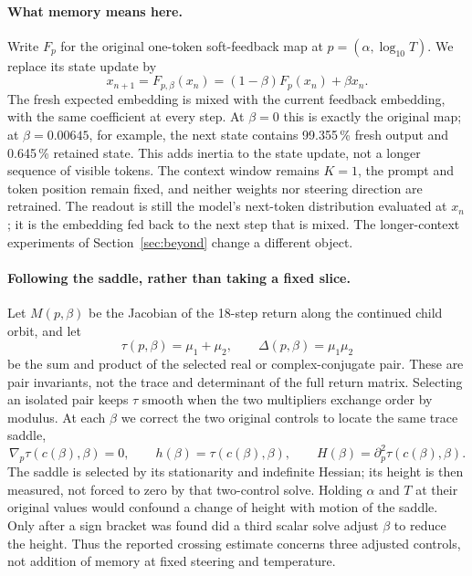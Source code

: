 \documentclass[11pt,letterpaper]{article}
\begin{document}
\paragraph{What memory means here.} Write $F_p$ for the original one-token soft-feedback map at
$p=(\alpha,\log_{10}T)$. We replace its state update by
\begin{equation}
 x_{n+1}=F_{p,\beta}(x_n)=(1-\beta)F_p(x_n)+\beta x_n.
 \label{eq:retainedfeedback}
\end{equation}
The fresh expected embedding is mixed with the current feedback embedding, with the same coefficient at every
step. At $\beta=0$ this is exactly the original map; at $\beta=0.00645$, for example, the next state contains
99.355\,\% fresh output and 0.645\,\% retained state. This adds inertia to the state update, not a longer sequence
of visible tokens. The context window remains $K=1$, the prompt and token position remain fixed, and neither
weights nor steering direction are retrained. The readout is still the model's next-token distribution evaluated
at $x_n$; it is the embedding fed back to the next step that is mixed. The longer-context experiments of
Section~\ref{sec:beyond} change a different object.

\paragraph{Following the saddle, rather than taking a fixed slice.} Let $M(p,\beta)$ be the Jacobian of the
18-step return along the continued child orbit, and let
\begin{equation}
 \tau(p,\beta)=\mu_1+\mu_2,\qquad \Delta(p,\beta)=\mu_1\mu_2
 \label{eq:memorypair}
\end{equation}
be the sum and product of the selected real or complex-conjugate pair. These are pair invariants, not the trace
and determinant of the full return matrix. Selecting an isolated pair keeps $\tau$ smooth when the two multipliers
exchange order by modulus. At each $\beta$ we correct the two original controls to locate the same trace saddle,
\begin{equation}
 \nabla_p\tau(c(\beta),\beta)=0,\qquad
 h(\beta)=\tau(c(\beta),\beta),\qquad
 H(\beta)=\partial_p^2\tau(c(\beta),\beta).
 \label{eq:memorysaddle}
\end{equation}
The saddle is selected by its stationarity and indefinite Hessian; its height is then measured, not forced to
zero by that two-control solve. Holding $\alpha$ and $T$ at their original values would confound a change of height
with motion of the saddle. Only after a sign bracket was found did a third scalar solve adjust $\beta$ to reduce
the height. Thus the reported crossing estimate concerns three adjusted controls, not addition of memory at fixed
steering and temperature.
\end{document}
